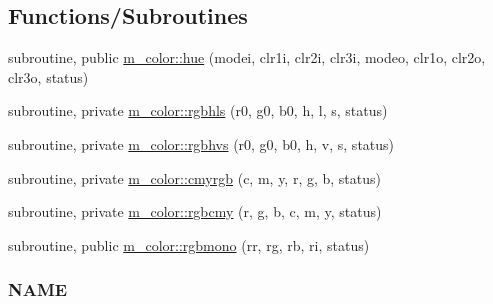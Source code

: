 \subsection*{Functions/\+Subroutines}
\begin{DoxyCompactItemize}
\item 
subroutine, public \mbox{\hyperlink{namespacem__color_a56dd07bbf1378ccc78a230d171f9d429}{m\+\_\+color\+::hue}} (modei, clr1i, clr2i, clr3i, modeo, clr1o, clr2o, clr3o, status)
\item 
subroutine, private \mbox{\hyperlink{namespacem__color_a1dd027cbe65112af243d26195b1fc49a}{m\+\_\+color\+::rgbhls}} (r0, g0, b0, h, l, s, status)
\item 
subroutine, private \mbox{\hyperlink{namespacem__color_a76f00e1d418c4904a963094bc730a0e6}{m\+\_\+color\+::rgbhvs}} (r0, g0, b0, h, v, s, status)
\item 
subroutine, private \mbox{\hyperlink{namespacem__color_ab91687e87d0901874e52efe5933e3044}{m\+\_\+color\+::cmyrgb}} (c, m, y, r, g, b, status)
\item 
subroutine, private \mbox{\hyperlink{namespacem__color_ad6e8505eef5add299c4475d289f3c5c5}{m\+\_\+color\+::rgbcmy}} (r, g, b, c, m, y, status)
\item 
subroutine, public \mbox{\hyperlink{namespacem__color_aca19999686fc20d79da580c6a643dc35}{m\+\_\+color\+::rgbmono}} (rr, rg, rb, ri, status)
\begin{DoxyCompactList}\small\item\em \subsubsection*{N\+A\+ME}


\end{DoxyCompactList}
\end{DoxyCompactItemize}
